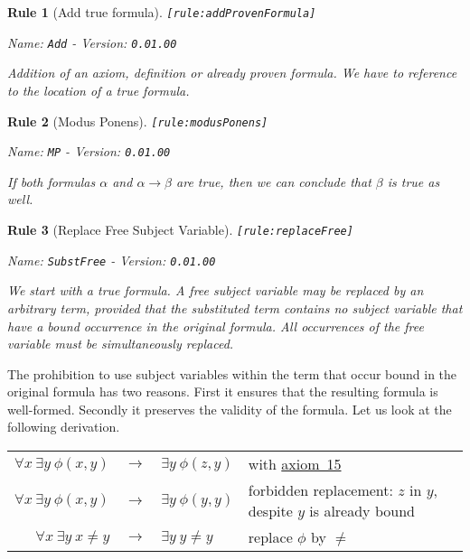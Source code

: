 \documentclass[a4paper,german,10pt,twoside]{book}
\newtheorem{rul}{Rule}
\theoremstyle{definition}
\theoremstyle{remark}
\begin{document}
\begin{rul}[Add true formula]
\label{rule:addProvenFormula} \hypertarget{rule:addProvenFormula}{}
{\tt \tiny [\verb]rule:addProvenFormula]]}

\par
{\em   Name: \verb]Add]  -  Version: \verb]0.01.00]}


Addition of an axiom, definition or already proven formula. We have to reference to the location of a true formula.
\end{rul}


\begin{rul}[Modus Ponens]
\label{rule:modusPonens} \hypertarget{rule:modusPonens}{}
{\tt \tiny [\verb]rule:modusPonens]]}

\par
{\em   Name: \verb]MP]  -  Version: \verb]0.01.00]}


If both formulas $\alpha$ and $\alpha \rightarrow \beta$ are true, then we can conclude that $\beta$ is true as well.
\end{rul}


\begin{rul}[Replace Free Subject Variable]
\label{rule:replaceFree} \hypertarget{rule:replaceFree}{}
{\tt \tiny [\verb]rule:replaceFree]]}

\par
{\em   Name: \verb]SubstFree]  -  Version: \verb]0.01.00]}


We start with a true formula.
A free subject variable may be replaced by an arbitrary term, provided that the substituted term contains no subject variable that have a bound occurrence in the original formula. All occurrences of the free variable must be simultaneously replaced.
\end{rul}

The prohibition to use subject variables within the term that occur bound in the original formula has two reasons. First it ensures that the resulting formula is well-formed. Secondly it preserves the validity of the formula. Let us look at the following derivation.

\par
\begin{tabularx}{\linewidth}{rclX}
  $\forall x \ \exists y \ \phi(x, y)$ & $\rightarrow$ & $\exists y \ \phi(z,y)$ 
    & with \hyperlink{axiom:universalInstantiation}{axiom~15} \\
  $\forall x \ \exists y \ \phi(x, y)$ & $\rightarrow$ & $\exists y \ \phi(y,y)$ 
    & forbidden replacement: $z$ in $y$, despite $y$ is already bound \\
  $\forall x \ \exists y \ x \neq y$ & $\rightarrow$ & $\exists y \ y \neq y$ 
    & replace $\phi$ by $\neq$
\end{tabularx}
\end{document}
